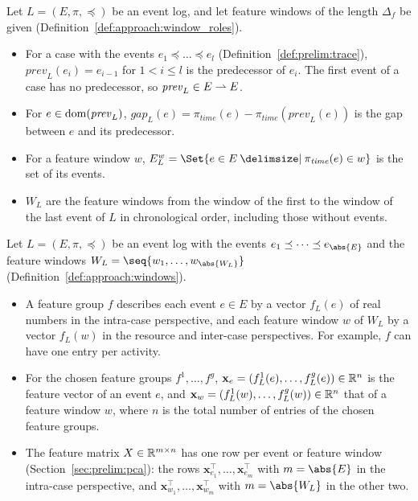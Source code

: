 \begin{definition}
	\label{def:approach:windows}
	Let $L = (E, \pi, \preceq)$ be an event log, and let feature windows of the length $\Delta_f$ be given (Definition~\ref{def:approach:window_roles}).
	\begin{itemize}
		\item For a case with the events $e_1 \preceq \dots \preceq e_l$ (Definition~\ref{def:prelim:trace}), $\mathit{prev}_L(e_i) = e_{i-1}$ for $1 < i \le l$ is the predecessor of $e_i$. The first event of a case has no predecessor, so $\mathit{prev}_L \in E \rightharpoonup E$.
		\item For $e \in \operatorname*{dom}(\mathit{prev}_L)$, $\mathit{gap}_L(e) = \pi_{\mathit{time}}(e) - \pi_{\mathit{time}}(\mathit{prev}_L(e))$ is the gap between $e$ and its predecessor.
		\item For a feature window $w$, $E^w_L = \Set{e \in E \given \pi_{\mathit{time}}(e) \in w}$ is the set of its events.
		\item $W_L$ are the feature windows from the window of the first to the window of the last event of $L$ in chronological order, including those without events.
	\end{itemize}
\end{definition}

\begin{definition}
	\label{def:approach:feature_extraction}
	Let $L = (E, \pi, \preceq)$ be an event log with the events $e_1 \preceq \dots \preceq e_{\abs{E}}$ and the feature windows $W_L = \seq{w_1, \dots, w_{\abs{W_L}}}$ (Definition~\ref{def:approach:windows}).
	\begin{itemize}
		\item A feature group $f$ describes each event $e \in E$ by a vector $f_L(e)$ of real numbers in the intra-case perspective, and each feature window $w$ of $W_L$ by a vector $f_L(w)$ in the resource and inter-case perspectives. For example, $f$ can have one entry per activity.
		\item For the chosen feature groups $f^1, \dots, f^g$, $\mathbf{x}_e = (f^1_L(e), \dots, f^g_L(e)) \in \mathbb R^n$ is the feature vector of an event $e$, and $\mathbf{x}_w = (f^1_L(w), \dots, f^g_L(w)) \in \mathbb R^n$ that of a feature window $w$, where $n$ is the total number of entries of the chosen feature groups.
		\item The feature matrix $X \in \mathbb R^{m \times n}$ has one row per event or feature window (Section~\ref{sec:prelim:pca}): the rows $\mathbf{x}_{e_1}^\top, \dots, \mathbf{x}_{e_m}^\top$ with $m = \abs{E}$ in the intra-case perspective, and $\mathbf{x}_{w_1}^\top, \dots, \mathbf{x}_{w_m}^\top$ with $m = \abs{W_L}$ in the other two.
	\end{itemize}
\end{definition}

